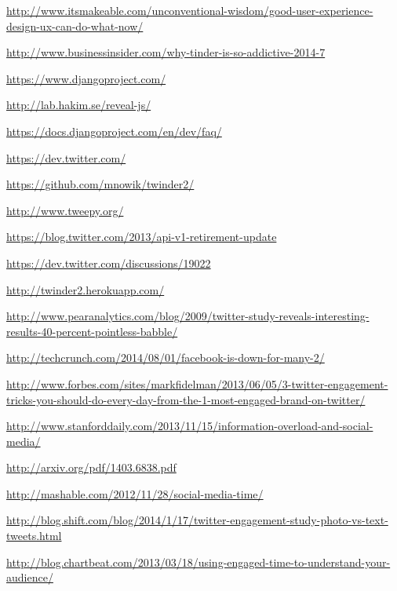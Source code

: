 \begin{thebibliography}{9}

\url{http://www.itsmakeable.com/unconventional-wisdom/good-user-experience-design-ux-can-do-what-now/}

\url{http://www.businessinsider.com/why-tinder-is-so-addictive-2014-7}


\url{https://www.djangoproject.com/}

\url{http://lab.hakim.se/reveal-js/}

\url{https://docs.djangoproject.com/en/dev/faq/}

\url{https://dev.twitter.com/}

\url{https://github.com/mnowik/twinder2/}

\url{http://www.tweepy.org/}

\url{https://blog.twitter.com/2013/api-v1-retirement-update}

\url{https://dev.twitter.com/discussions/19022}

\url{http://twinder2.herokuapp.com/}



\url{http://www.pearanalytics.com/blog/2009/twitter-study-reveals-interesting-results-40-percent-pointless-babble/}

\url{http://techcrunch.com/2014/08/01/facebook-is-down-for-many-2/}

\url{http://www.forbes.com/sites/markfidelman/2013/06/05/3-twitter-engagement-tricks-you-should-do-every-day-from-the-1-most-engaged-brand-on-twitter/}

\url{http://www.stanforddaily.com/2013/11/15/information-overload-and-social-media/}

\url{http://arxiv.org/pdf/1403.6838.pdf}

\url{http://mashable.com/2012/11/28/social-media-time/}

\url{http://blog.shift.com/blog/2014/1/17/twitter-engagement-study-photo-vs-text-tweets.html}

\url{http://blog.chartbeat.com/2013/03/18/using-engaged-time-to-understand-your-audience/}
  
\end{thebibliography}


